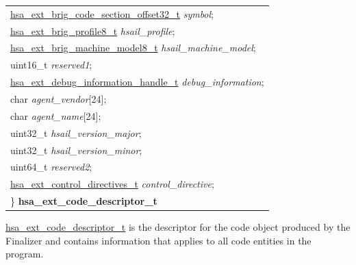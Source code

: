 \documentclass[final]{book}
\newcommand{\reffld}[1]{\textit{#1}}
\begin{document}
\begin{tcolorbox}[breakable,nobeforeafter,arc=0mm,colframe=white,colback=lightgray,left=0mm]
\begin{longtable}{@{}p{\textwidth}}
\hspace{1.7em}\hyperlink{group__FinalizerCoreApi_1ga494b8ac14a8c10af95b83b51a8a4ad7f}{hsa_ext_brig_code_section_offset32_t} \reffld{symbol};\\
\hspace{1.7em}\hyperlink{group__FinalizerCoreApi_1ga4d058e43da41c147915dbe70cace9947}{hsa_ext_brig_profile8_t} \reffld{hsail_profile};\\
\hspace{1.7em}\hyperlink{group__FinalizerCoreApi_1ga5030b76e1c72556f42a7dc7eebab16df}{hsa_ext_brig_machine_model8_t} \reffld{hsail_machine_model};\\
\hspace{1.7em}uint16_t \reffld{reserved1};\\
\hspace{1.7em}\hyperlink{group__FinalizerCoreApi_1gaf4c0bece520460a2d77a9309905395f3}{hsa_ext_debug_information_handle_t} \reffld{debug_information};\\
\hspace{1.7em}char \reffld{agent_vendor}[24];\\
\hspace{1.7em}char \reffld{agent_name}[24];\\
\hspace{1.7em}uint32_t \reffld{hsail_version_major};\\
\hspace{1.7em}uint32_t \reffld{hsail_version_minor};\\
\hspace{1.7em}uint64_t \reffld{reserved2};\\
\hspace{1.7em}\hyperlink{group__FinalizerCoreApi_1ga40c83573be6c1e21ad46ff8a7edd21b0}{hsa_ext_control_directives_t} \reffld{control_directive};\\
\}  \hypertarget{group__FinalizerCoreApi_1ga0e01eabc57d7105ea37e1abbb50fa337}{\textbf{hsa_ext_code_descriptor_t}}
\end{longtable}

\end{tcolorbox}
\hyperlink{group__FinalizerCoreApi_1ga0e01eabc57d7105ea37e1abbb50fa337}{hsa_ext_code_descriptor_t} is the descriptor for the code object produced by the Finalizer and contains information that applies to all code entities in the program.
\end{document}

